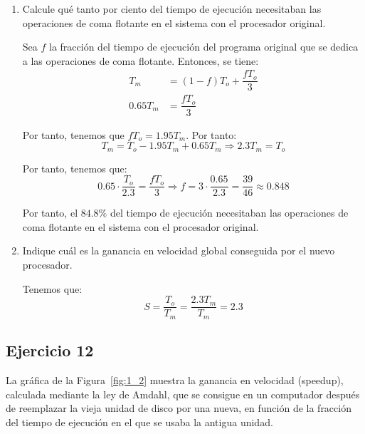 \begin{enumerate}
    \item Calcule qué tanto por ciento del tiempo de ejecución necesitaban las operaciones de coma flotante en el sistema con el procesador original.
    
    Sea $f$ la fracción del tiempo de ejecución del programa original que se dedica a las operaciones de coma flotante. Entonces, se tiene:
    \begin{align*}
        T_m &= (1-f)T_o + \dfrac{fT_o}{3}\\
        0.65T_m &= \dfrac{fT_o}{3}
    \end{align*}

    Por tanto, tenemos que $fT_o=1.95T_m$. Por tanto:
    \begin{equation*}
        T_m = T_o - 1.95T_m + 0.65T_m\Longrightarrow
        2.3T_m = T_o
    \end{equation*}

    Por tanto, tenemos que:
    \begin{equation*}
        0.65\cdot \dfrac{T_o}{2.3} = \dfrac{fT_o}{3}\Longrightarrow
        f = 3\cdot \dfrac{0.65}{2.3} = \dfrac{39}{46}\approx 0.848
    \end{equation*}

    Por tanto, el $84.8\%$ del tiempo de ejecución necesitaban las operaciones de coma flotante en el sistema con el procesador original.
    \item Indique cuál es la ganancia en velocidad global conseguida por el nuevo procesador.
    
    Tenemos que:
    \begin{equation*}
        S = \dfrac{T_o}{T_m} = \dfrac{2.3T_m}{T_m} = 2.3
    \end{equation*}
\end{enumerate}

\subsection*{Ejercicio 12}

La gráfica de la Figura~\ref{fig:1_2} muestra la ganancia en velocidad (speedup), calculada mediante la ley de Amdahl, que se consigue en un computador después de reemplazar la vieja unidad de disco por una nueva, en función de la fracción del tiempo de ejecución en el que se usaba la antigua unidad.

